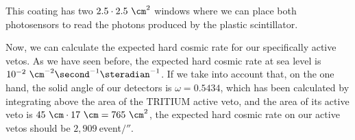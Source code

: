 This coating has two $2.5\cdot{} 2.5 ~\cm^2$ windows where we can place both photosensors to read the photons produced by the plastic scintillator.

Now, we can calculate the expected hard cosmic rate for our specifically active vetos. As we have seen before, the expected hard cosmic rate at sea level is $10^{-2}~\cm^{-2}\second^{-1}\steradian^{-1}$. If we take into account that, on the one hand, the solid angle of our detectors is $\omega=0.5434$, which has been calculated by integrating above the area of the TRITIUM active veto, and the area of its active veto is $45~\cm \cdot{} 17~\cm=765~\cm^2$, the expected hard cosmic rate on our active vetos should be $2,909~$event$/\second$.